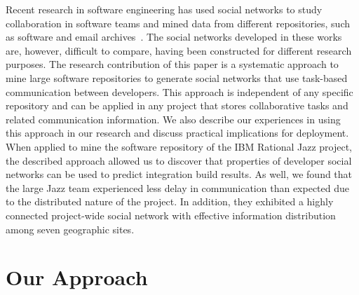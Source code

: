 Recent research in software engineering has used social networks to study
collaboration in software teams and mined data from different repositories, such
as software and email
archives~\cite{bird:msr:2006,herbsleb:2008fse,ehrlich2008:gaps}. The social networks
developed in these works are, however, difficult to compare, having been
constructed for different research purposes. The research contribution of this
paper is a systematic approach to mine large software repositories to generate
social networks that use task-based communication between developers. This
approach is independent of any specific repository and can be applied in any
project that stores collaborative tasks and related communication information. We
also describe our experiences in using this approach in our research and discuss
practical implications for deployment. When applied to mine the software
repository of the IBM Rational Jazz project, the described approach allowed us to
discover that properties of developer social networks can be used to predict
integration build results. As well, we found that the large Jazz team experienced
less delay in communication than expected due to the distributed nature of the
project. In addition, they exhibited a highly connected project-wide social
network with effective information distribution among seven geographic sites.







\section{Our Approach} 



